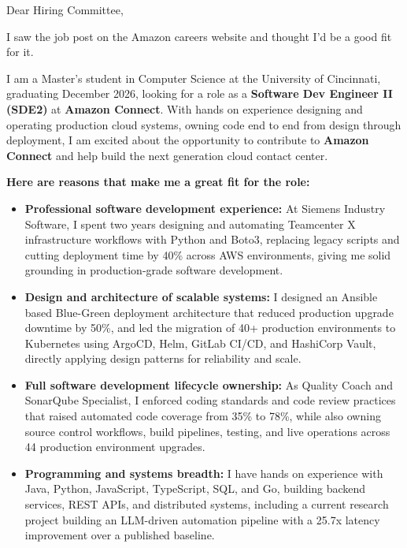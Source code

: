 \documentclass[11pt]{letter}
\date{}
\begin{document}
\begin{letter}{}

\opening{Dear Hiring Committee,}

I saw the job post on the Amazon careers website and thought I'd be a good fit for it.

I am a Master's student in Computer Science at the University of Cincinnati, graduating December 2026, looking for a role as a \textbf{Software Dev Engineer II (SDE2)} at \textbf{Amazon Connect}. With hands on experience designing and operating production cloud systems, owning code end to end from design through deployment, I am excited about the opportunity to contribute to \textbf{Amazon Connect} and help build the next generation cloud contact center.

\textbf{Here are reasons that make me a great fit for the role:}

\begin{itemize}[leftmargin=*, itemsep=0.45em]
    \item \textbf{Professional software development experience:} At Siemens Industry Software, I spent two years designing and automating Teamcenter X infrastructure workflows with Python and Boto3, replacing legacy scripts and cutting deployment time by 40\% across AWS environments, giving me solid grounding in production-grade software development.

    \item \textbf{Design and architecture of scalable systems:} I designed an Ansible based Blue-Green deployment architecture that reduced production upgrade downtime by 50\%, and led the migration of 40+ production environments to Kubernetes using ArgoCD, Helm, GitLab CI/CD, and HashiCorp Vault, directly applying design patterns for reliability and scale.

    \item \textbf{Full software development lifecycle ownership:} As Quality Coach and SonarQube Specialist, I enforced coding standards and code review practices that raised automated code coverage from 35\% to 78\%, while also owning source control workflows, build pipelines, testing, and live operations across 44 production environment upgrades.

    \item \textbf{Programming and systems breadth:} I have hands on experience with Java, Python, JavaScript, TypeScript, SQL, and Go, building backend services, REST APIs, and distributed systems, including a current research project building an LLM-driven automation pipeline with a 25.7x latency improvement over a published baseline.
\end{itemize}


\end{letter}
\end{document}
